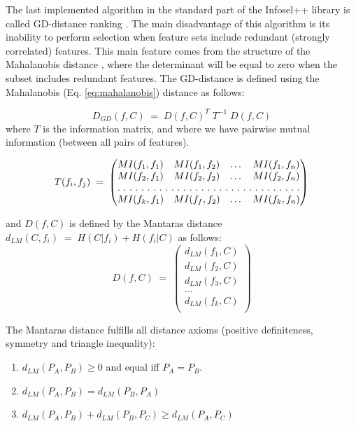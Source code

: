\documentclass[a4paper,fleqn]{report}
\newcommand\be{\vspace*{1pt}\begin{equation}}
\newcommand\ee{\end{equation}\vspace*{1pt}}
\begin{document}


The last implemented algorithm in the standard part of the Infosel++ library is called GD-distance ranking \cite{Mantaras1994}.
The main disadvantage of this algorithm is its inability to perform selection when feature sets include redundant (strongly correlated)
features. This main feature comes from the structure of the Mahalanobis distance \cite{DudaHart1973}, where the determinant will be equal to zero 
when the subset includes redundant features. The GD-distance is defined using the Mahalanobis (Eq. \ref{eq:mahalanobis}) distance as follows: 

\be \label{eq:mahalanobis}
D_{GD}(f,C)\;=\;D(f,C)^{T}\; T^{-1} \; D(f,C)
\ee
where $T$ is the information matrix, and where we have pairwise mutual information (between all pairs of features). 

\begin{equation} \label{eq:infomatrix}
T(f_i,f_j) \;=\; \left(
\begin{matrix}
MI(f_1,f_1) & MI(f_1,f_2) & \dots & MI(f_1,f_n) \\
MI(f_2,f_1) & MI(f_2,f_2) & \dots & MI(f_2,f_n) \\
\hdotsfor[2]{4} \\
MI(f_k,f_1) & MI(f_f,f_2) & \dots & MI(f_k,f_n) \\
\end{matrix}
\right)
\end{equation}

and $D(f,C)$ is defined by the Mantaras distance $d_{LM} (C,f_i) \;=\; H(C|f_i) + H(f_i|C)$ \cite{Mantaras1991} as follows:
\be \label{eq:MantDist}
D(f,C) \;=\;
\left(
\begin{matrix}
        d_{LM} (f_1,C) \\
        d_{LM} (f_2,C) \\
        d_{LM} (f_3,C) \\
        \dots \\
        d_{LM} (f_k,C) \\
\end{matrix}
\right)
\ee

 The Mantaras distance \cite{Mantaras1991} fulfills all distance axioms (positive definiteness, symmetry and triangle inequality):
\begin{enumerate}
\item $ d_{LM} \left( P_{A}, P_{B} \right) \geq 0 $ and equal iff $ P_{A} = P_{B} $.
\item $ d_{LM} \left( P_{A}, P_{B} \right) = d_{LM} \left( P_{B}, P_{A} \right) $
\item $ d_{LM} \left( P_{A}, P_{B} \right) + d_{LM} \left( P_{B}, P_{C} \right) \geq d_{LM} \left( P_{A}, P_{C} \right) $
\end{enumerate}
\end{document}
